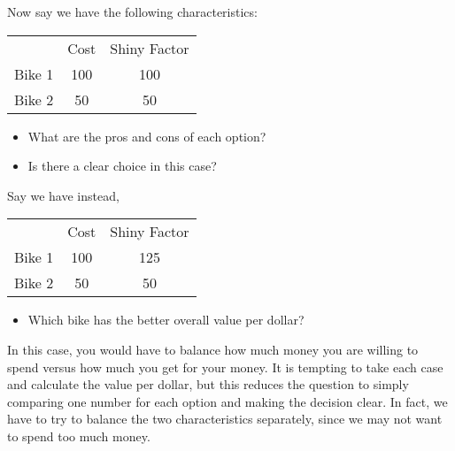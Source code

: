 Now say we have the following characteristics:


        \begin{table}[H]
        \centering
        \begin{tabular}{rcc}
        \multicolumn{1}{l}{} & Cost & Shiny Factor \\ \cline{2-3} 
        \multicolumn{1}{r|}{Bike 1} & \multicolumn{1}{c|}{100}  & \multicolumn{1}{c|}{100} \\ \cline{2-3} 
        \multicolumn{1}{r|}{Bike 2} & \multicolumn{1}{c|}{50} & \multicolumn{1}{c|}{50}  \\ \cline{2-3} 
        \end{tabular}
        \end{table}
       
       
\begin{itemize}
\item What are the pros and cons of each option?
\item Is there a clear choice in this case?
\end{itemize}


Say we have instead,


        \begin{table}[H]
        \centering
        \begin{tabular}{rcc}
        \multicolumn{1}{l}{} & Cost & Shiny Factor \\ \cline{2-3} 
        \multicolumn{1}{r|}{Bike 1} & \multicolumn{1}{c|}{100}  & \multicolumn{1}{c|}{125} \\ \cline{2-3} 
        \multicolumn{1}{r|}{Bike 2} & \multicolumn{1}{c|}{50} & \multicolumn{1}{c|}{50}  \\ \cline{2-3} 
        \end{tabular}
        \end{table}
       

\begin{itemize}
\item Which bike has the better overall value per dollar?
\end{itemize}


In this case, you would have to balance how much money you are willing to spend versus how much you get for your money. It is tempting to take each case and calculate the value per dollar, but this reduces the question to simply comparing one number for each option and making the decision clear. In fact, we have to try to balance the two characteristics separately, since we may not want to spend too much money.


